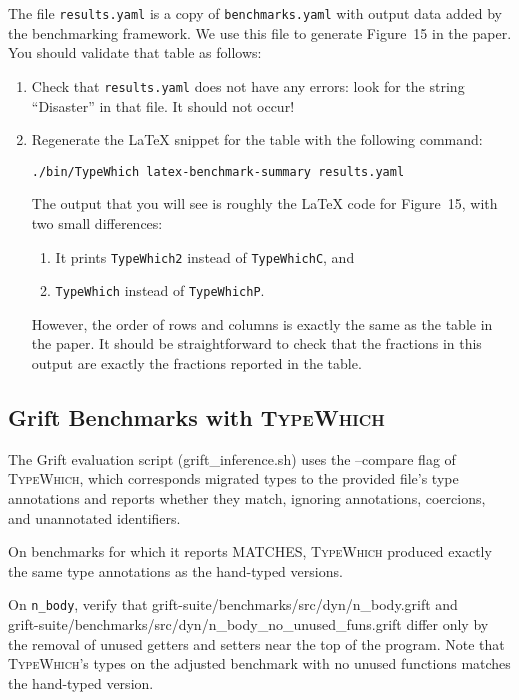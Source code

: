 \documentclass{book}
\newcommand{\system}{\textsc{TypeWhich}\xspace}
\begin{document}
The file \texttt{results.yaml} is a copy of \texttt{benchmarks.yaml} with output
data added by the benchmarking framework. We use this file to generate Figure~15
in the paper. You should validate that table as follows:

\begin{enumerate}

\item Check that \texttt{results.yaml} does not have any errors: look for the
string ``Disaster'' in that file. It should not occur!

\item Regenerate the LaTeX snippet for the table with the following command:

\begin{verbatim}
./bin/TypeWhich latex-benchmark-summary results.yaml     
\end{verbatim}
The output that you will see is roughly the LaTeX code for Figure~15,
with two small differences:
\begin{enumerate}
\item It prints \texttt{TypeWhich2} instead of \texttt{TypeWhichC}, and
\item  \texttt{TypeWhich} instead of \texttt{TypeWhichP}.
\end{enumerate}

However, the order of rows and columns is exactly the same as the table in the
paper. It should be straightforward to check that the fractions in this output
are exactly the fractions reported in the table.

\end{enumerate}

\subsection{Grift Benchmarks with \system}

The Grift evaluation script (grift\_inference.sh) uses the --compare flag
of \system, which corresponds migrated types to the provided file's type
annotations and reports whether they match, ignoring annotations, coercions,
and unannotated identifiers.

On benchmarks for which it reports MATCHES, \system produced exactly the same type
annotations as the hand-typed versions.

On \texttt{n\_body}, verify that grift-suite/benchmarks/src/dyn/n\_body.grift
and \\
grift-suite/benchmarks/src/dyn/n\_body\_no\_unused\_funs.grift differ only
by the removal of unused getters and setters near the top of the
program. Note that \system's types on the adjusted benchmark with no unused
functions matches the hand-typed version.
\end{document}
